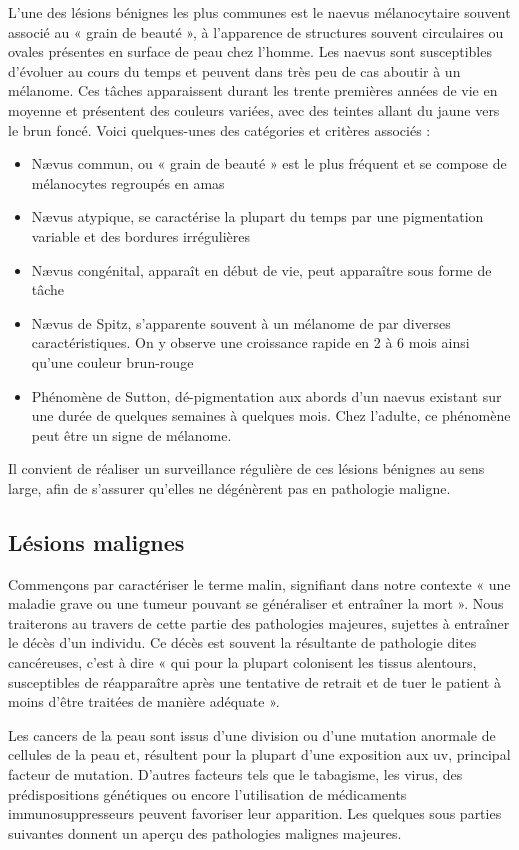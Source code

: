 L'une des lésions bénignes les plus communes est le naevus mélanocytaire souvent associé au « grain de beauté », à l’apparence de structures souvent circulaires ou ovales présentes en surface de peau chez l’homme. Les naevus sont susceptibles d’évoluer au cours du temps et peuvent dans très peu de cas aboutir à un mélanome. Ces tâches apparaissent durant les trente premières années de vie en moyenne et présentent des couleurs variées, avec des teintes allant du jaune vers le brun foncé. Voici quelques-unes des catégories et critères associés :
\begin{itemize}
\item Nævus commun, ou « grain de beauté » est le plus fréquent et se compose de mélanocytes regroupés en amas
\item Nævus atypique, se caractérise la plupart du temps par une pigmentation variable et des bordures irrégulières
\item Nævus congénital, apparaît en début de vie, peut apparaître sous forme de tâche
\item Nævus de Spitz, s’apparente souvent à un mélanome de par diverses caractéristiques. On y observe une croissance rapide en 2 à 6 mois ainsi qu’une couleur brun-rouge
\item Phénomène de Sutton, dé-pigmentation aux abords d’un naevus existant sur une durée de quelques semaines à quelques mois. Chez l’adulte, ce phénomène peut être un signe de mélanome.
\end{itemize}
Il convient de réaliser un surveillance régulière de ces lésions bénignes au sens large, afin de s'assurer qu'elles ne dégénèrent pas en pathologie maligne.\par

\subsection{Lésions malignes}
Commençons par caractériser le terme malin, signifiant dans notre contexte « une maladie grave ou une tumeur pouvant se généraliser et entraîner la mort ». Nous traiterons au travers de cette partie des pathologies majeures, sujettes à entraîner le décès d’un individu. Ce décès est souvent la résultante de pathologie dites cancéreuses, c'est à dire « qui pour la plupart colonisent les tissus alentours, susceptibles de réapparaître après une tentative de retrait et de tuer le patient à moins d’être traitées de manière adéquate ».\par

Les cancers de la peau sont issus d’une division ou d’une mutation anormale de cellules de la peau et, résultent pour la plupart d’une exposition aux \gls{uv}, principal facteur de mutation. D’autres facteurs tels que le tabagisme, les virus, des prédispositions génétiques ou encore l’utilisation de médicaments immunosuppresseurs peuvent favoriser leur apparition. Les quelques sous parties suivantes donnent un aperçu des pathologies malignes majeures.\par

